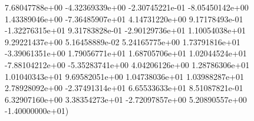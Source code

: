   7.68047788e+00 -4.32369339e+00 -2.30745221e-01 -8.05450142e+00\\
  1.43389046e+00 -7.36485907e+01  4.14731220e+00  9.17178493e-01\\
 -1.32276315e+01  9.31783828e-01 -2.90129736e+01  1.10054038e+01\\
  9.29221437e+00  5.16458889e-02  5.24165775e+00  1.73791816e+01\\
 -3.39061351e+00  1.79056771e+01  1.68705706e+01  1.02044524e+01\\
 -7.88104212e+00 -5.35283741e+00  4.04206126e+00  1.28786306e+01\\
  1.01040343e+01  9.69582051e+00  1.04738036e+01  1.03988287e+01\\
  2.78928092e+00 -2.37491314e+01  6.65533633e+01  8.51087821e-01\\
  6.32907160e+00  3.38354273e+01 -2.72097857e+00  5.20890557e+00\\
 -1.40000000e+01) \\